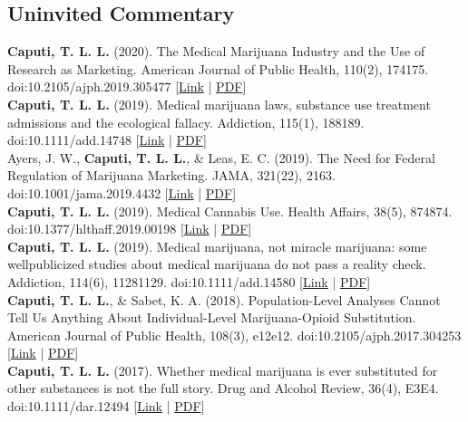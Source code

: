 \subsection*{Uninvited Commentary}\noindent
{}\textbf{\textbf{Caputi, T. L.} L.} (2020). The Medical Marijuana Industry and the Use of Research as Marketing. American Journal of Public Health, 110(2), 174175. doi:10.2105/ajph.2019.305477 [\href{https://ajph.aphapublications.org/doi/10.2105/AJPH.2019.305477}{Link} | \href{https://www.theodorecaputi.com/files/AJPH-2020.pdf}{PDF}] \\[.2cm]
\textbf{\textbf{Caputi, T. L.} L.} (2019). Medical marijuana laws, substance use treatment admissions and the ecological fallacy. Addiction, 115(1), 188189. doi:10.1111/add.14748 [\href{https://onlinelibrary.wiley.com/doi/full/10.1111/add.14748}{Link} | \href{https://www.theodorecaputi.com/files/ADD-2020.pdf}{PDF}] \\[.2cm]
Ayers, J. W., \textbf{\textbf{Caputi, T. L.} L.}, & Leas, E. C. (2019). The Need for Federal Regulation of Marijuana Marketing. JAMA, 321(22), 2163. doi:10.1001/jama.2019.4432 [\href{https://jamanetwork.com/journals/jama/article-abstract/2734209}{Link} | \href{https://www.theodorecaputi.com/files/JAMA-2019.pdf}{PDF}] \\[.2cm]
\textbf{\textbf{Caputi, T. L.} L.} (2019). Medical Cannabis Use. Health Affairs, 38(5), 874874. doi:10.1377/hlthaff.2019.00198 [\href{https://www.healthaffairs.org/doi/10.1377/hlthaff.2019.00198}{Link} | \href{https://www.theodorecaputi.com/files/HA-2019.pdf}{PDF}] \\[.2cm]
\textbf{\textbf{Caputi, T. L.} L.} (2019). Medical marijuana, not miracle marijuana: some wellpublicized studies about medical marijuana do not pass a reality check. Addiction, 114(6), 11281129. doi:10.1111/add.14580 [\href{https://onlinelibrary.wiley.com/doi/full/10.1111/add.14580}{Link} | \href{https://www.theodorecaputi.com/files/ADD-2019.pdf}{PDF}] \\[.2cm]
\textbf{\textbf{Caputi, T. L.} L.}, & Sabet, K. A. (2018). Population-Level Analyses Cannot Tell Us Anything About Individual-Level Marijuana-Opioid Substitution. American Journal of Public Health, 108(3), e12e12. doi:10.2105/ajph.2017.304253 [\href{https://ajph.aphapublications.org/doi/10.2105/AJPH.2017.304253}{Link} | \href{https://www.theodorecaputi.com/files/AJPH_letter-2018.pdf}{PDF}] \\[.2cm]
\textbf{\textbf{Caputi, T. L.} L.} (2017). Whether medical marijuana is ever substituted for other substances is not the full story. Drug and Alcohol Review, 36(4), E3E4. doi:10.1111/dar.12494 [\href{https://onlinelibrary.wiley.com/doi/abs/10.1111/dar.12494}{Link} | \href{https://www.theodorecaputi.com/files/DAR-2017.pdf}{PDF}] \\[.2cm]
